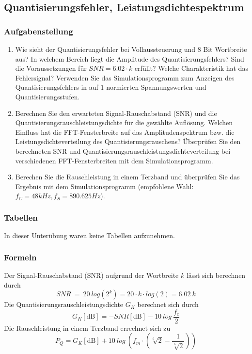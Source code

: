 \subsection{Quantisierungsfehler, Leistungsdichtespektrum}
\subsubsection{Aufgabenstellung}
\begin{enumerate}
\item Wie sieht der Quantisierungsfehler bei Vollaussteuerung und $8$ Bit Wortbreite aus? In welchem Bereich liegt die Amplitude des Quantisierungsfehlers? Sind die Voraussetzungen für $SNR = 6.02 \cdot k$ erfüllt? Welche Charakteristik hat das Fehlersignal? Verwenden Sie das Simulationsprogramm zum Anzeigen des Quantisierungsfehlers in auf $1$ normierten Spannungswerten und Quantisierungsstufen. 
\item Berechnen Sie den erwarteten Signal-Rauschabstand (SNR) und die Quantisierungsrauschleistungsdichte für die gewählte Auflösung. Welchen Einfluss hat die FFT-Fensterbreite auf das Amplitudenspektrum bzw. die Leistungsdichteverteilung des Quantisierungsrauschens?
Überprüfen Sie den berechneten SNR und Quantisierungsrauschleistungsdichteverteilung bei verschiedenen FFT-Fensterbreiten mit dem Simulationsprogramm. 
\item Berechen Sie die Rauschleistung in einem Terzband und überprüfen Sie das Ergebnis mit dem Simulationsprogramm (empfohlene Wahl: $f_C = 48kHz, f_{S} = 890.625Hz$). 
\end{enumerate}



\subsubsection{Tabellen}
In dieser Unterübung waren keine Tabellen aufzunehmen. 
\subsubsection{Formeln}
Der Signal-Rauschabstand (SNR) aufgrund der Wortbreite $k$ lässt sich berechnen durch 
\begin{equation}
\label{form:SNR}
SNR \ = \ 20 \ log \left(2^k\right) = 20 \cdot k \cdot log \left( 2 \right) = 6.02 \ k
\end{equation}
Die Quantisierungsrauschleistungsdichte $G_K$ berechnet sich durch
\begin{equation}
\label{form:G_K}
G_K[\text{dB}] = -SNR[\text{dB}] - 10 \ log \ \frac{f_c}{2}
\end{equation}
Die Rauschleistung in einem Terzband errechnet sich zu
\begin{equation}
P_{Q} = G_K [\text{dB}] + 10 \ log \ \left( f_m \cdot (\sqrt[6]{2}-\frac{1}{\sqrt[6]{2}})\right) 
\end{equation}
